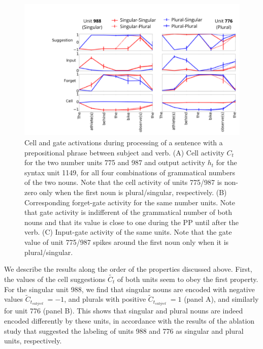 \begin{figure}[ht]
\includegraphics[width=\textwidth]{Figures/Figure2_number_units_775_987_suggestion_input_forget.png}
\caption{Cell and gate activations during processing of a sentence with a prepositional phrase between subject and verb. (A) Cell activity $C_t$ for the two number units 775 and 987 and output activity $h_t$ for the syntax unit 1149, for all four combinations of grammatical numbers of the two nouns. Note that the cell activity of units 775/987 is non-zero only when the first noun is plural/singular, respectively. (B) Corresponding forget-gate activity for the same number units. Note that gate activity is indifferent of the grammatical number of both nouns and that its value is close to one during the PP until after the verb. (C) Input-gate activity of the same units. Note that the gate value of unit 775/987 spikes around the first noun only when it is plural/singular.}
\end{figure}


We describe the results along the order of the properties discussed above. First, the values of the cell suggestions $\tilde{C_t}$ of both units seem to obey the first property. For the singular unit 988, we find that singular nouns are encoded with negative values $\tilde{C}_{t_{subject}}~=-1$, and plurals with positive $\tilde{C}_{t_{subject}}~=1$ (panel A), and similarly for unit 776 (panel B). This shows that singular and plural nouns are indeed encoded differently by these units, in accordance with the results of the ablation study that suggested the labeling of units 988 and 776 as singular and plural units, respectively.

